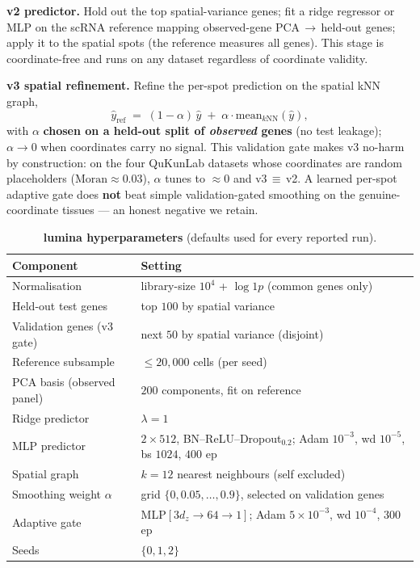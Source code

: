 \documentclass[10pt,letterpaper]{article}
\begin{document}
\textbf{v2 predictor.} Hold out the top spatial-variance genes; fit a ridge regressor
or MLP on the scRNA reference mapping observed-gene PCA\,$\to$\,held-out genes; apply it
to the spatial spots (the reference measures all genes). This stage is
coordinate-free and runs on any dataset regardless of coordinate validity.

\textbf{v3 spatial refinement.} Refine the per-spot prediction on the spatial kNN
graph,
\[
  \hat{y}_{\mathrm{ref}} \;=\; (1-\alpha)\,\hat{y} \;+\;
  \alpha\cdot\mathrm{mean}_{k\mathrm{NN}}(\hat{y}),
\]
with $\alpha$ \textbf{chosen on a held-out split of \emph{observed} genes} (no test
leakage); $\alpha\!\to\!0$ when coordinates carry no signal. This validation gate
makes v3 no-harm by construction: on the four QuKunLab datasets whose coordinates are
random placeholders ($\mathrm{Moran}\approx 0.03$), $\alpha$ tunes to
$\approx 0$ and v3\,$\equiv$\,v2. A learned per-spot adaptive gate does
\textbf{not} beat simple validation-gated smoothing on the genuine-coordinate tissues
--- an honest negative we retain.

\begin{table}[h]
\centering
\small
\caption{\textbf{lumina hyperparameters} (defaults used for every reported run).}
\label{tab:hparams}
\begin{tabular}{ll}
\toprule
Component & Setting\\
\midrule
Normalisation & library-size $10^4$ + $\log\!1p$ (common genes only)\\
Held-out test genes & top $100$ by spatial variance\\
Validation genes (v3 gate) & next $50$ by spatial variance (disjoint)\\
Reference subsample & $\le 20{,}000$ cells (per seed)\\
PCA basis (observed panel) & $200$ components, fit on reference\\
Ridge predictor & $\lambda=1$\\
MLP predictor & $2\times512$, BN--ReLU--Dropout$_{0.2}$; Adam $10^{-3}$, wd $10^{-5}$, bs $1024$, $400$ ep\\
Spatial graph & $k=12$ nearest neighbours (self excluded)\\
Smoothing weight $\alpha$ & grid $\{0,0.05,\dots,0.9\}$, selected on validation genes\\
Adaptive gate & MLP$[3d_z\!\to\!64\!\to\!1]$; Adam $5\!\times\!10^{-3}$, wd $10^{-4}$, $300$ ep\\
Seeds & $\{0,1,2\}$\\
\bottomrule
\end{tabular}
\end{table}
\end{document}
